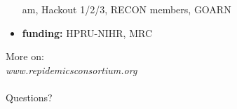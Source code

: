 \documentclass[xcolor=svgnames,mathserif]{beamer}
\begin{document}
\begin{frame}[fragile]
\begin{itemize}
am, Hackout 1/2/3, RECON members, GOARN
\vspace{.3cm}
\item \textbf{funding:} HPRU-NIHR, MRC
\end{itemize}


\end{frame}





\begin{frame}[standout]
More on:\\
\emph{www.repidemicsconsortium.org}\\
~\\
Questions?
\end{frame}
\end{document}
